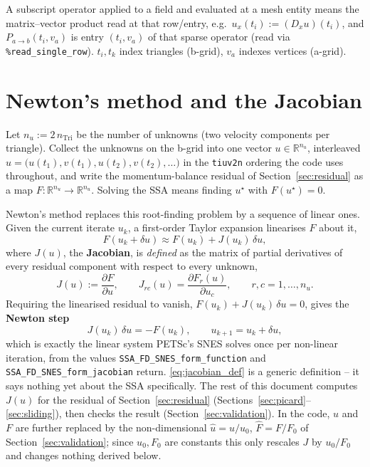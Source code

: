 \documentclass[11pt]{article}
\newcommand{\code}[1]{\texttt{#1}}
\newcommand{\ti}{t_i}
\newcommand{\tk}{t_k}
\newcommand{\va}{v_a}
\begin{document}
A subscript operator applied to a field and evaluated at a mesh entity means
the matrix--vector product read at that row/entry, e.g.\
$u_x(\ti) := (D_x u)(\ti)$, and $P_{a\to b}(\ti,\va)$ is entry $(\ti,\va)$ of
that sparse operator (read via \code{\%read\_\allowbreak single\_\allowbreak row}). $\ti,\tk$ index
triangles (b-grid), $\va$ indexes vertices (a-grid).

\section{Newton's method and the Jacobian}
\label{sec:newton}

Let $n_u := 2\,n_{\mathrm{Tri}}$ be the number of unknowns (two velocity
components per triangle). Collect the unknowns on the b-grid into one vector
$u\in\mathbb{R}^{n_u}$, interleaved
$u=\big(u(t_1),v(t_1),u(t_2),v(t_2),\dots\big)$ in the \code{tiuv2n} ordering
the code uses throughout, and write the momentum-balance residual of
Section~\ref{sec:residual} as a map $F:\mathbb{R}^{n_u}\to\mathbb{R}^{n_u}$.
Solving the SSA means finding $u^\star$ with $F(u^\star)=0$.

Newton's method replaces this root-finding problem by a sequence of linear
ones. Given the current iterate $u_k$, a first-order Taylor expansion
linearises $F$ about it,
\begin{equation}
F(u_k+\delta u) \approx F(u_k) + J(u_k)\,\delta u,
\end{equation}
where $J(u)$, the \textbf{Jacobian}, is \emph{defined} as the matrix of partial
derivatives of every residual component with respect to every unknown,
\begin{equation}
J(u) := \frac{\partial F}{\partial u}, \qquad
J_{rc}(u) = \frac{\partial F_r(u)}{\partial u_c}, \qquad r,c = 1,\dots,n_u.
\label{eq:jacobian_def}
\end{equation}
Requiring the linearised residual to vanish, $F(u_k) + J(u_k)\,\delta u = 0$,
gives the \textbf{Newton step}
\begin{equation}
J(u_k)\,\delta u = -F(u_k), \qquad u_{k+1} = u_k + \delta u,
\label{eq:newton_step}
\end{equation}
which is exactly the linear system PETSc's SNES solves once per non-linear
iteration, from the values \code{SSA\_\allowbreak FD\_\allowbreak SNES\_\allowbreak form\_\allowbreak function} and
\code{SSA\_\allowbreak FD\_\allowbreak SNES\_\allowbreak form\_\allowbreak jacobian} return. \eqref{eq:jacobian_def} is a
generic definition -- it says nothing yet about the SSA specifically. The rest
of this document computes $J(u)$ for the residual of Section~\ref{sec:residual}
(Sections~\ref{sec:picard}--\ref{sec:sliding}), then checks the result
(Section~\ref{sec:validation}). In the code, $u$ and $F$ are further replaced
by the non-dimensional $\hat u = u/u_0$, $\hat F = F/F_0$ of
Section~\ref{sec:validation}; since $u_0,F_0$ are constants this only rescales
$J$ by $u_0/F_0$ and changes nothing derived below.
\end{document}
